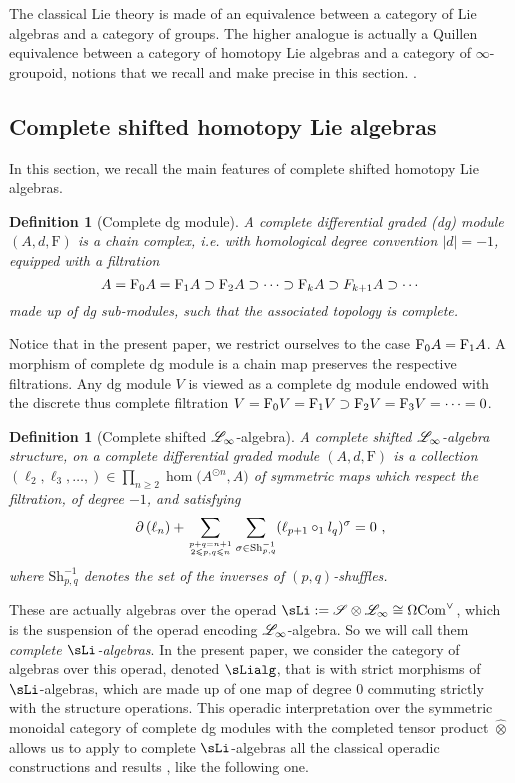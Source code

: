 \documentclass[twoside, 10pt]{amsart}
\newtheorem{definition}[lemma]{Definition}
\begin{document}
The classical Lie theory is made of an equivalence between a category of Lie algebras and a category of groups. The higher analogue is actually a Quillen equivalence between a category of homotopy Lie algebras and a category of $\infty$-groupoid, notions that we recall and make precise in this section. . 


\subsection{Complete shifted homotopy Lie algebras}
In this section, we recall the main features of complete shifted homotopy Lie algebras. 


\begin{definition}[Complete dg module]
A \emph{complete differential graded (dg) module} $(A, d, \mathrm{F})$ is a chain complex, i.e. with homological degree convention $|d|=-1$, equipped with a filtration 
\[A=\mathrm{F}_0 A = \mathrm{F}_1 A \supset \mathrm{F}_2 A \supset \cdots \supset \mathrm{F}_k A \supset F_{k+1}A \supset \cdots\]
made up of dg sub-modules, such that the associated topology is complete. 
\end{definition}

Notice that in the present paper, we restrict ourselves to the case $\mathrm{F}_0 A = \mathrm{F}_1 A$. A morphism of complete dg module is a chain map preserves the respective filtrations. 
Any dg module  $V$ is viewed as a complete dg module endowed with the discrete thus complete filtration $V=\mathrm{F}_0 V = \mathrm{F}_1  V\supset \mathrm{F}_2 V= \mathrm{F}_3 V=  \cdots=0$. 

\begin{definition}[Complete shifted  $\mathscr{L}_\infty$-algebra]
A \emph{complete shifted  $\mathscr{L}_\infty$-algebra structure}, on a complete differential graded module $(A, d, \mathrm{F})$ is a collection 
$(\ell_2, \ell_3, \ldots, )\in \prod_{n\geqslant 2} \hom\big(A^{\odot n}, A\big)$ of symmetric maps which respect the filtration, of degree $-1$, and  satisfying 
\[
 \partial\left(\ell_n\right)+\sum_{p+q=n+1\atop 2\leqslant p,q \leqslant n}
\sum_{\sigma\in \mathrm{Sh}_{p,q}^{-1}}
 (\ell_{p+1}\circ_{1} l_q)^{\sigma}=0\ ,
\]
where $ \mathrm{Sh}_{p,q}^{-1}$ denotes the set of the inverses of $(p,q)$-shuffles.
\end{definition}

These are actually algebras over the operad $\sLi:=\susp\otimes \L_\infty\cong \Cobar \com^\vee$, which is the suspension of the operad encoding $\mathscr{L}_\infty$-algebra. So we will call them \emph{complete $\sLi$-algebras}. 
In the present paper, we  consider the category of algebras over this operad, denoted $\sLialg$, that is with 
 strict morphisms of $\sLi$-algebras, which are made up of one map of degree $0$ commuting strictly with the structure operations. This operadic interpretation over the symmetric monoidal category of complete dg modules with the completed tensor product $\widehat{\otimes}$ \cite{DotsenkoShadrinVallette18} allows us to apply to complete $\sLi$-algebras all the classical operadic constructions and results \cite{LodayVallette12}, like the following one.
 
\end{document}
